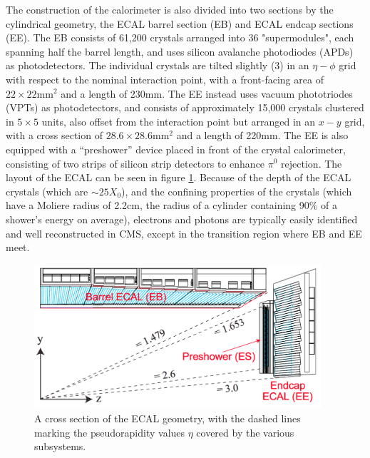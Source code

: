 The construction of the calorimeter is also divided into two sections by the cylindrical geometry, the ECAL barrel section (EB) and ECAL endcap sections (EE). The EB consists of 61,200 crystals arranged into 36 "supermodules", each spanning half the barrel length, and uses silicon avalanche photodiodes (APDs) as photodetectors. The individual crystals are tilted slightly (3\textdegree) in an $\eta-\phi$ grid with respect to the nominal interaction point, with a front-facing area of $22\times22\text{mm}^2$ and a length of 230mm. The EE instead uses vacuum phototriodes (VPTs) as photodetectors, and consists of approximately 15,000 crystals clustered in $5\times5$ units, also offset from the interaction point but arranged in an $x-y$ grid, with a cross section of $28.6\times28.6\text{mm}^2$ and a length of 220mm. The EE is also equipped with a ``preshower'' device placed in front of the crystal calorimeter, consisting of two strips of silicon strip detectors to enhance $\pi^0$ rejection. The layout of the ECAL can be seen in figure \ref{fig:ecalGeometry}. Because of the depth of the ECAL crystals (which are $\sim25X_0$), and the confining properties of the crystals (which have a Moliere radius of 2.2cm, the radius of a cylinder containing 90\% of a shower's energy on average), electrons and photons are typically easily identified and well reconstructed in CMS, except in the transition region where EB and EE meet.
\begin{figure}
	\centering
	\includegraphics[width=0.95\textwidth]{detector/figs/ecalGeometry}
	\renewcommand{\baselinestretch}{1.0}
	\caption[A cross section of the ECAL geometry, with the dashed lines marking the pseudorapidity values $\eta$ covered by the various subsystems.]{A cross section of the ECAL geometry, with the dashed lines marking the pseudorapidity values $\eta$ covered by the various subsystems.}
	\label{fig:ecalGeometry}
\end{figure}


